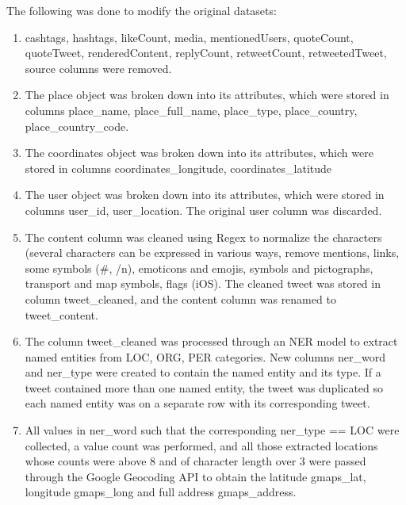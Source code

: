 The following was done to modify the original datasets:
\begin{enumerate}
    \item {\selectfont cashtags, hashtags, likeCount, media, mentionedUsers, quoteCount, quoteTweet, renderedContent, replyCount, retweetCount, retweetedTweet, source} columns were removed.
    
    \item The {\selectfont place} object was broken down into its attributes, which were stored in columns {\selectfont place\_name, place\_full\_name, place\_type, place\_country, place\_country\_code}.
    
    \item The {\selectfont coordinates} object was broken down into its attributes, which were stored in columns {\selectfont coordinates\_longitude, coordinates\_latitude}
    
    \item The {\selectfont user} object was broken down into its attributes, which were stored in columns {\selectfont user\_id, user\_location}. The original {\selectfont user} column was discarded.
    
    \item The {\selectfont content} column was cleaned using Regex to normalize the characters (several characters can be expressed in various ways,
    remove mentions, links, some symbols (\@ \#, /n), emoticons and emojis, symbols and pictographs, transport and map symbols, flags (iOS). The cleaned tweet was stored in column {\selectfont tweet\_cleaned}, and the {\selectfont content} column was renamed to {\selectfont tweet\_content}.

    \item The column {\selectfont tweet\_cleaned} was processed through an NER model to extract named entities from {\selectfont LOC, ORG, PER} categories. New columns {\selectfont ner\_word} and {\selectfont ner\_type} were created to contain the named entity and its type. If a tweet contained more than one named entity, the tweet was duplicated so each named entity was on a separate row with its corresponding tweet.

    \item All values in {\selectfont ner\_word} such that the corresponding {\selectfont ner\_type == LOC} were collected, a value count was performed, and all those extracted locations whose counts were above 8 and of character length over 3 were passed through the Google Geocoding API to obtain the latitude {\selectfont gmaps\_lat}, longitude {\selectfont gmaps\_long} and full address {\selectfont gmaps\_address}.


\end{enumerate}
